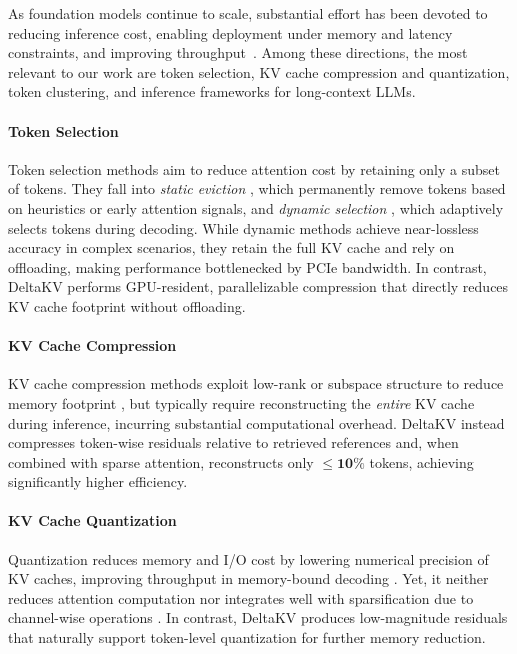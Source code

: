 As foundation models continue to scale, substantial effort has been devoted to reducing inference cost, enabling deployment under memory and latency constraints, and improving throughput~\cite{li2024snapkv, oren2024transformers_tova, liu2024intactkv, lin2025quantization, qi2025deltallm, liu2024deepseekv2, guo2025enhancing, hao2025tokenLRC}. 
Among these directions, the most relevant to our work are token selection, KV cache compression and quantization, token clustering, and inference frameworks for long-context LLMs.

\paragraph{Token Selection} 
Token selection methods aim to reduce attention cost by retaining only a subset of tokens.
They fall into \emph{static eviction} \cite{zhang2023h2o, oren2024transformers_tova, li2024snapkv, streamingllm}, which permanently remove tokens based on heuristics or early attention signals, and \emph{dynamic selection} \cite{hao2025omnikv, tang2024quest, zhang2025pqcache, xiao2024infllm, liu2025deepseek32, sun2024shadowkv}, which adaptively selects tokens during decoding. 
While dynamic methods achieve near-lossless accuracy in complex scenarios, they retain the full KV cache and rely on offloading, making performance bottlenecked by PCIe bandwidth. 
In contrast, DeltaKV performs GPU-resident, parallelizable compression that directly reduces KV cache footprint without offloading.


\paragraph{KV Cache Compression} 
KV cache compression methods exploit low-rank or subspace structure to reduce memory footprint \cite{saxena2024eigen, zhang2024lorc, chang2025palu, liu2024deepseekv2}, but typically require reconstructing the \emph{entire} KV cache during inference, incurring substantial computational overhead. 
DeltaKV instead compresses token-wise residuals relative to retrieved references and, when combined with sparse attention, reconstructs only $\le \mathbf{10\%}$ tokens, achieving significantly higher efficiency.


\paragraph{KV Cache Quantization} 
Quantization reduces memory and I/O cost by lowering numerical precision of KV caches, improving throughput in memory-bound decoding \cite{liu2024kivi, xiao2023smoothquant,hooper2024kvquant, he2024zipcache}. 
Yet, it neither reduces attention computation nor integrates well with sparsification due to channel-wise operations \cite{liu2024kivi}.
In contrast, DeltaKV produces low-magnitude residuals that naturally support token-level quantization for further memory reduction.


